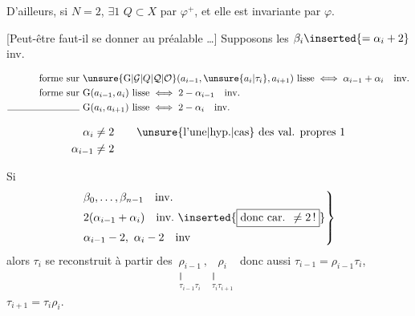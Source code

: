 D'ailleurs, si $N=2$, $\exists 1$  $Q\subset X$  par $\varphi^{+}$, et elle est \deleted{\unsure{--}} invariante par $\varphi$.

[Peut-être faut-il se donner au préalable   \ldots{}]
Supposons les $\beta_i\inserted{=\alpha_i+2}$ inv.

\[
\begin{aligned}
\text{forme sur }&\unsure{\mathrm{G}|\mathcal G|Q|\mathcal Q|\mathcal O}(a_{i-1},\unsure{a_i|\tau_i},a_{i+1})\ \text{lisse}\iff\alpha_{i-1}+\alpha_i\quad\text{inv.}\\
\text{forme sur }&\mathrm{G}(a_{i-1},a_i)\ \text{lisse}\iff 2-\alpha_{i-1}\quad\text{inv.}\\
\text{\rule{2.6cm}{0.35pt} }&\mathrm{G}(a_i,a_{i+1})\ \text{lisse}\iff 2-\alpha_i\quad\text{inv.}
\end{aligned}
\]


\[
\begin{aligned}
\alpha_{i}&\ne 2\qquad\text{\unsure{l'une|hyp.|cas} des val. propres }1\\
\alpha_{i-1}&\ne 2
\end{aligned}
\]

 Si
\[
\left.\begin{aligned}
&\beta_0,\ldots,\beta_{n-1}\quad\text{inv.}\\
&2(\alpha_{i-1}+\alpha_i)\quad\text{inv.}\ \inserted{\boxed{\text{donc car. }\ne2\,!}}\\
&\alpha_{i-1}-2,\ \alpha_i-2\quad\text{inv}
\end{aligned}\right\}
\]
alors $\tau_i$ se reconstruit à partir des $\underset{\substack{\Vert\\ \tau_{i-1}\tau_i}}{\rho_{i-1}},\underset{\substack{\Vert\\ \tau_i\tau_{i+1}}}{\rho_i}$ donc aussi $\tau_{i-1}=\rho_{i-1}\tau_i$, $\tau_{i+1}=\tau_i\rho_i$.

